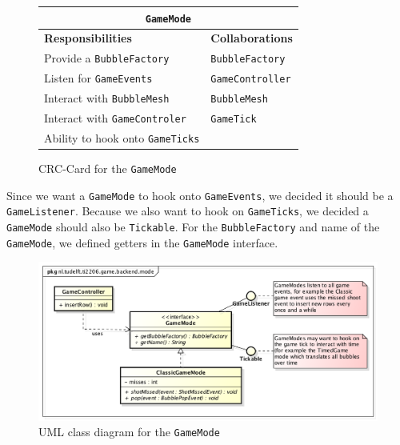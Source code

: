 \documentclass[a4paper]{article}
\begin{document}
\begin{figure}[H]
    \begin{center}
    \begin{tabular}{ | p{8cm} | p{4cm} | }
      \multicolumn{2}{c}{\texttt{GameMode}} \\ \hline
      \textbf{Responsibilities} & \textbf{Collaborations} \\ \hline
      Provide a \texttt{BubbleFactory} & \texttt{BubbleFactory} \\
      Listen for \texttt{GameEvents} & \texttt{GameController} \\
      Interact with \texttt{BubbleMesh} & \texttt{BubbleMesh} \\
      Interact with \texttt{GameControler} & \texttt{GameTick} \\
      Ability to hook onto \texttt{GameTicks} & \\
      \hline
    \end{tabular}
    \end{center}
    \caption{CRC-Card for the \texttt{GameMode}}
\end{figure}

Since we want a \texttt{GameMode} to hook onto \texttt{GameEvents}, we decided it should be a \texttt{GameListener}. Because we also want to hook on \texttt{GameTicks}, we decided a \texttt{GameMode} should also be \texttt{Tickable}. For the \texttt{BubbleFactory} and name of the \texttt{GameMode}, we defined getters in the \texttt{GameMode} interface.

\begin{figure}[H]
	\centering
	\includegraphics[scale=0.5]{GameMode.png}
    \caption{UML class diagram for the \texttt{GameMode}}
\end{figure}
\end{document}

